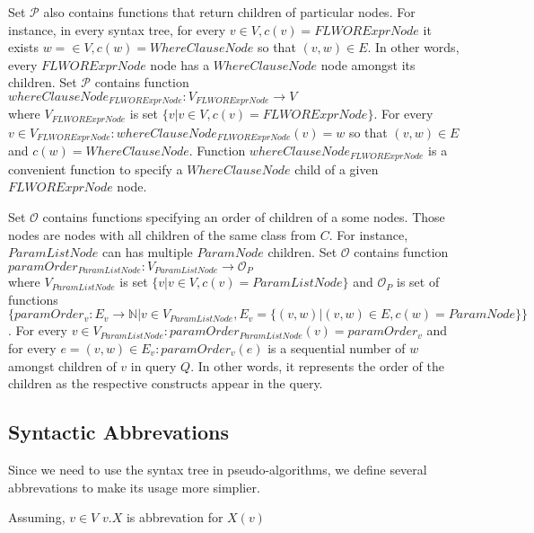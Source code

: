 Set $\mathcal{P}$ also contains functions that return children of particular nodes. For instance, in every syntax tree, for every $v \in V, c(v) = FLWORExprNode$ it exists $w = \in V, c(w) = WhereClauseNode$ so that $(v,w) \in E$. In other words, every $FLWORExprNode$ node has a $WhereClauseNode$ node amongst its children. Set $\mathcal{P}$ contains function \\
$whereClauseNode_{FLWORExprNode} : V_{FLWORExprNode} \rightarrow V$ \\ 
where $V_{FLWORExprNode}$ is set $\{v | v \in V, c(v) = FLWORExprNode\}$. For every $v \in V_{FLWORExprNode}: whereClauseNode_{FLWORExprNode}(v) = w$ so that $(v, w) \in E$ and $c(w) = WhereClauseNode$. Function $whereClauseNode_{FLWORExprNode}$ is a convenient function to specify a $WhereClauseNode$ child of a given $FLWORExprNode$ node.

Set $\mathcal{O}$ contains functions specifying an order of children of a some nodes. Those nodes are nodes with all children of the same class from $C$. For instance, $ParamListNode$ can has multiple $ParamNode$ children. Set $\mathcal{O}$ contains function \\
$paramOrder_{ParamListNode} : V_{ParamListNode} \rightarrow \mathcal{O}_P$ \\
where $V_{ParamListNode}$ is set $\{v | v \in V, c(v) = ParamListNode\}$ and $\mathcal{O}_P$ is set of functions $\{paramOrder_v : E_v \rightarrow \mathbb{N} | v \in V_{ParamListNode}, E_v = \{(v,w) | (v,w) \in E, c(w) = ParamNode\}\}$. For every $v \in V_{ParamListNode}: paramOrder_{ParamListNode}(v) = paramOrder_v$ and for every $e = (v, w) \in E_v: paramOrder_v(e)$ is a sequential number of $w$ amongst children of $v$ in query $Q$. In other words, it represents the order of the children as the respective constructs appear in the query.

\subsection{Syntactic Abbrevations}
Since we need to use the syntax tree in pseudo-algorithms, we define several abbrevations to make its usage more simplier.

Assuming, $v \in V$
$v.X$ is abbrevation for $X(v)$

